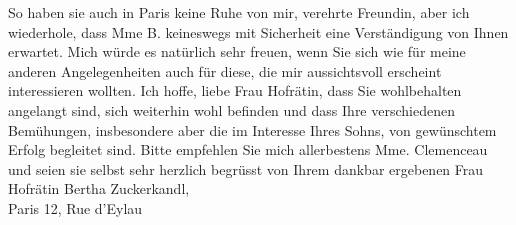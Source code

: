 \pstart
           So haben sie auch in Paris keine Ruhe von mir,
               verehrte Freundin, aber ich wiederhole, dass Mme B. keineswegs mit Sicherheit eine Verständigung von Ihnen erwartet. Mich
               würde es natürlich sehr freuen, wenn Sie sich wie für meine anderen Angelegenheiten
               auch für diese, die mir aussichtsvoll erscheint interessieren wollten. Ich hoffe,
               liebe Frau Hofrätin, dass Sie wohlbehalten angelangt sind, sich weiterhin wohl
               befinden und dass Ihre verschiedenen Bemühungen, insbesondere {\pb}aber die im Interesse Ihres Sohns, von gewünschtem Erfolg begleitet
               sind. Bitte empfehlen Sie mich allerbestens Mme. Clemenceau und seien sie selbst sehr herzlich begrüsst von\pend
           {\vspace{1\baselineskip}}\pstart Ihrem dankbar ergebenen\pend{}{\vspace{1\baselineskip}}
\pstart
           \noindent{}Frau Hofrätin Bertha Zuckerkandl,{\\}Paris 12, Rue d’Eylau\pend
           \endnumbering{}
\begin{anhang}
\end{anhang}\newcommand{\dateiname}{L03954}\newcommand{\titel}{Arthur Schnitzler an Berta Zuckerkandl, 20. 11. 1924}\newcommand{\editorInnen}{Herausgegeben von Jahnke, SelmaMüller, Martin Anton}
